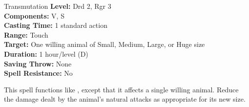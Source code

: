{Transmutation}
{
	\textbf{Level:}
	Drd 2, Rgr 3\\
	\textbf{Components:}
	V, S\\
	\textbf{Casting Time:}
	1 standard action\\
	\textbf{Range:}
	Touch\\
	\textbf{Target:}
	One willing animal of Small, Medium, Large, or Huge size\\
	\textbf{Duration:}
	1 hour/level (D)\\
	\textbf{Saving Throw:}
	None\\
	\textbf{Spell Resistance:}
	No\\
}
{
	This spell functions like , except that it affects a single willing animal. Reduce the damage dealt by the animal's natural attacks as appropriate for its new size.

}
